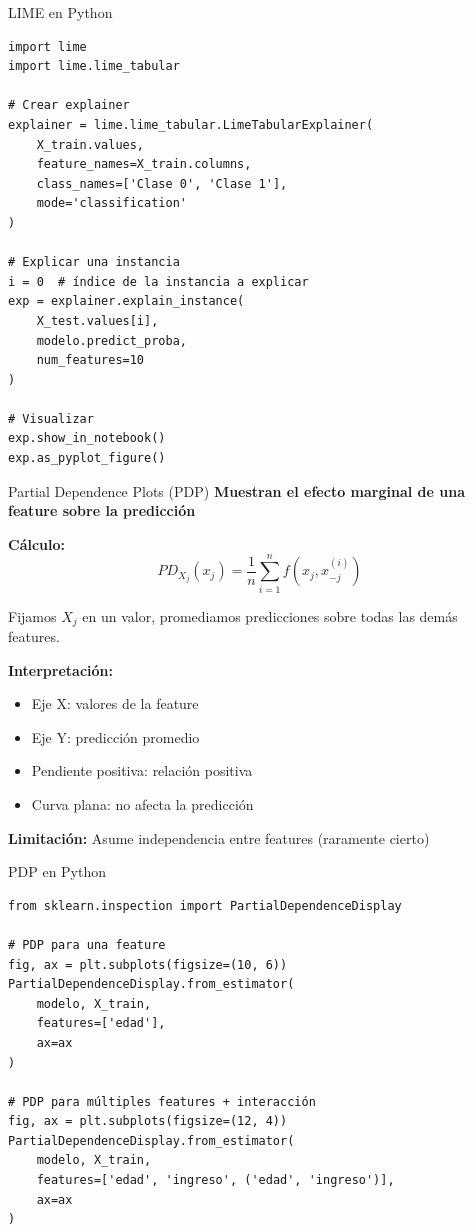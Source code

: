 \documentclass[aspectratio=169]{beamer}
\begin{document}
\begin{frame}[fragile]{LIME en Python}
\small
\begin{verbatim}
import lime
import lime.lime_tabular

# Crear explainer
explainer = lime.lime_tabular.LimeTabularExplainer(
    X_train.values,
    feature_names=X_train.columns,
    class_names=['Clase 0', 'Clase 1'],
    mode='classification'
)

# Explicar una instancia
i = 0  # índice de la instancia a explicar
exp = explainer.explain_instance(
    X_test.values[i], 
    modelo.predict_proba,
    num_features=10
)

# Visualizar
exp.show_in_notebook()
exp.as_pyplot_figure()
\end{verbatim}
\end{frame}

\begin{frame}{Partial Dependence Plots (PDP)}
\textbf{Muestran el efecto marginal de una feature sobre la predicción}

\vspace{0.3cm}

\textbf{Cálculo:}
$$PD_{X_j}(x_j) = \frac{1}{n}\sum_{i=1}^{n}f(x_j, x_{-j}^{(i)})$$

Fijamos $X_j$ en un valor, promediamos predicciones sobre todas las demás features.

\vspace{0.3cm}

\textbf{Interpretación:}
\begin{itemize}
\item Eje X: valores de la feature
\item Eje Y: predicción promedio
\item Pendiente positiva: relación positiva
\item Curva plana: no afecta la predicción
\end{itemize}

\vspace{0.3cm}

\textbf{Limitación:} Asume independencia entre features (raramente cierto)
\end{frame}

\begin{frame}[fragile]{PDP en Python}
\begin{verbatim}
from sklearn.inspection import PartialDependenceDisplay

# PDP para una feature
fig, ax = plt.subplots(figsize=(10, 6))
PartialDependenceDisplay.from_estimator(
    modelo, X_train, 
    features=['edad'],
    ax=ax
)

# PDP para múltiples features + interacción
fig, ax = plt.subplots(figsize=(12, 4))
PartialDependenceDisplay.from_estimator(
    modelo, X_train, 
    features=['edad', 'ingreso', ('edad', 'ingreso')],
    ax=ax
)
\end{verbatim}
\end{frame}
\end{document}
